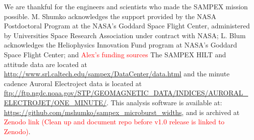 \documentclass[draft]{agujournal2019}
\begin{document}
\acknowledgments
We are thankful for the engineers and scientists who made the SAMPEX mission possible. M. Shumko acknowledges the support provided by the NASA Postdoctoral Program at the NASA’s Goddard Space Flight Center, administered by Universities Space Research Association under contract with NASA; L. Blum acknowledges the Heliophysics Innovation Fund program at NASA’s Goddard Space Flight Center; and \textcolor{red}{Alex's funding sources} The SAMPEX HILT and attitude data are located at \url{http://www.srl.caltech.edu/sampex/DataCenter/data.html} and the minute cadence Auroral Electroject data is located at \url{ftp://ftp.ngdc.noaa.gov/STP/GEOMAGNETIC_DATA/INDICES/AURORAL_ELECTROJET/ONE_MINUTE/}.
This analysis software is available at: \url{https://github.com/mshumko/sampex_microburst_widths}, and is archived at \textcolor{red}{Zenodo link (Clean up and document repo before v1.0 release is linked to Zenodo)}. 



%
%





%
%
%
%
%
\end{document}
